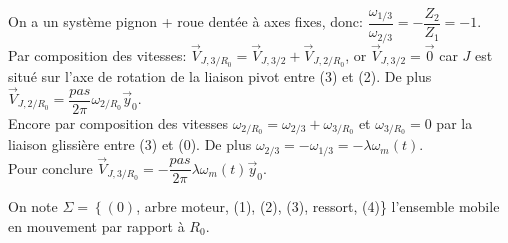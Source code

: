 \ifprof
\begin{corrige}
On a un système pignon + roue dentée à axes fixes, donc: $\boxed{\dfrac{\omega_{1/3}}{\omega_{2/3}} = - \dfrac{Z_2}{Z_1} = -1}$.\\

Par composition des vitesses: $\overrightarrow{V}_{J,3/R_0} = \overrightarrow{V}_{J,3/2} + \overrightarrow{V}_{J,2/R_0}$, or $\overrightarrow{V}_{J,3/2} = \overrightarrow{0}$ car $J$ est situé sur l'axe de rotation de la liaison pivot entre (3) et (2). De plus $\overrightarrow{V}_{J,2/R_0} = \dfrac{pas}{2\pi} \omega_{2/R_0}\overrightarrow{y}_0$.\\

Encore par composition des vitesses $\omega_{2/R_0} = \omega_{2/3} + \omega_{3/R_0}$ et $\omega_{3/R_0} = 0$ par la liaison glissière entre (3) et (0). De plus $\omega_{2/3} = -\omega_{1/3} = - \lambda \omega_m(t)$.\\

Pour conclure $\boxed{\overrightarrow{V}_{J,3/R_0} = - \dfrac{pas}{2\pi} \lambda \omega_m(t) \overrightarrow{y}_0}$.

\end{corrige}
\else
\fi

On note $\Sigma=\left\{(0)\right.$, arbre moteur, (1), (2), (3), ressort, (4)\} l'ensemble mobile en mouvement par rapport à $R_{0}$.\\


